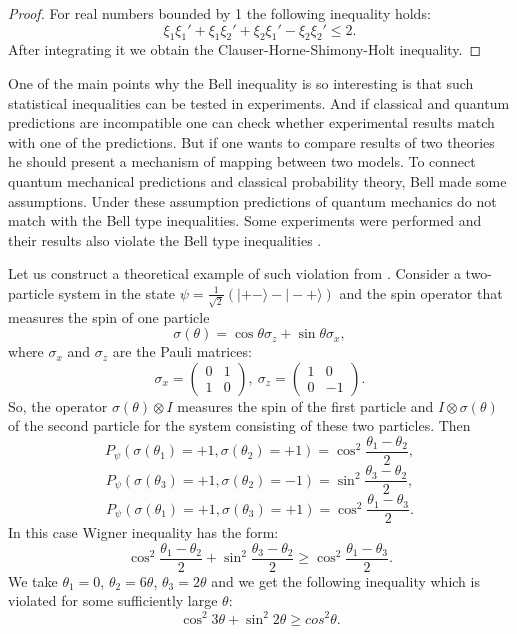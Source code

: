 \documentclass[%
master,         %
subf,           %
href,           %
colorlinks=true %
]{disser}
\numberwithin{equation}{section}
\numberwithin{figure}{section}
\begin{document}
\begin{proof}
For real numbers bounded by 1 the following inequality holds:
\[
\xi_1\xi_1' + \xi_1\xi_2' + \xi_2\xi_1' - \xi_2\xi_2' \leq 2.
\]
After integrating it we obtain the Clauser-Horne-Shimony-Holt inequality.

\end{proof}

One of the main points why the Bell inequality is so interesting is that such statistical inequalities can be tested in experiments. And if classical and quantum predictions are incompatible one can check whether experimental results match with one of the predictions. But if one wants to compare results of two theories he should present a mechanism of mapping between two models. To connect quantum mechanical predictions and classical probability theory, Bell made some assumptions. Under these assumption predictions of quantum mechanics do not match with the Bell type inequalities. Some experiments were performed and their results also violate the Bell type inequalities \cite{ASP1}.

Let us construct a theoretical example of such violation from \cite{Khrennikov_information}. Consider a two-particle system in the state $\psi = \frac{1}{\sqrt{2}}(|+-\rangle - |-+\rangle)$ and the spin operator that measures the spin of one particle
\[
\sigma(\theta) = \cos\theta\sigma_z + \sin\theta\sigma_x,
\] 
where $\sigma_x$ and $\sigma_z$ are the Pauli matrices:
\[
\sigma_x = 
\begin{pmatrix}
0 & 1\\
1 & 0
\end{pmatrix},\ \sigma_z = 
\begin{pmatrix}
1 & 0\\
0 & -1
\end{pmatrix}.
\]
So, the operator $\sigma(\theta) \otimes I$ measures the spin of the first particle and $I \otimes \sigma(\theta)$ of the second particle for the system consisting of these two particles.
Then
\[
P_\psi(\sigma(\theta_1) = + 1, \sigma(\theta_2) = +1) = \cos^2\frac{\theta_1 - \theta_2}{2},
\]
\[
P_\psi(\sigma(\theta_3) = + 1, \sigma(\theta_2) = -1) = \sin^2\frac{\theta_3 - \theta_2}{2},
\]
\[
P_\psi(\sigma(\theta_1) = + 1, \sigma(\theta_3) = +1) = \cos^2\frac{\theta_1 - \theta_3}{2}.
\]
In this case Wigner inequality has the form:
\[
\cos^2\frac{\theta_1 - \theta_2}{2} + \sin^2\frac{\theta_3 - \theta_2}{2} \geq  \cos^2\frac{\theta_1 - \theta_3}{2}.
\]
We take $\theta_1 = 0$, $\theta_2 = 6\theta$, $\theta_3 = 2\theta$ and we get the following inequality which is violated for some sufficiently large $\theta$:
\[
\cos^2 3\theta + \sin^2 2\theta \geq cos^2 \theta.
\]
\end{document}
